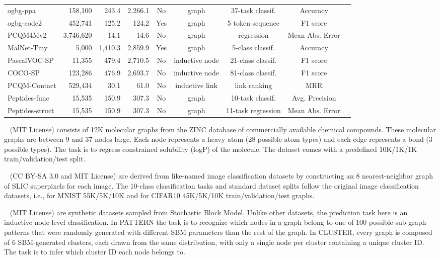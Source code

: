 \documentclass{article}
\begin{document}
\begin{table}[h]
\begin{adjustwidth}{-2.5 cm}{-2.5 cm}
\begin{tabular}{lrrrccccc}
    ogbg-ppa &158,100 &243.4 &2,266.1 &No &graph &37-task classif. &Accuracy \\
    ogbg-code2 &452,741 &125.2 &124.2 &Yes &graph &5 token sequence &F1 score \\
    PCQM4Mv2 &3,746,620 &14.1 &14.6 &No &graph &regression &Mean Abs. Error \\\midrule
    MalNet-Tiny &5,000 &1,410.3 &2,859.9 &Yes &graph &5-class classif. &Accuracy \\\midrule
    PascalVOC-SP & 11,355 & 479.4 & 2,710.5 & No &inductive node &21-class classif. &F1 score \\
    COCO-SP & 123,286 & 476.9 & 2,693.7 & No &inductive node &81-class classif. &F1 score \\
    PCQM-Contact & 529,434 & 30.1 & 61.0 & No &inductive link &link ranking &MRR \\
    Peptides-func & 15,535 & 150.9 & 307.3 & No &graph &10-task classif. &Avg. Precision \\
    Peptides-struct & 15,535 & 150.9 & 307.3 & No &graph &11-task regression &Mean Abs. Error \\
    \bottomrule
    \end{tabular}
\end{adjustwidth}\end{table}

~\cite{dwivedi2020benchmarking} (MIT License) consists of 12K molecular graphs from the ZINC database of commercially available chemical compounds. These molecular graphs are between 9 and 37 nodes large. Each node represents a heavy atom (28 possible atom types) and each edge represents a bond (3 possible types). The task is to regress constrained solubility (logP) of the molecule. The dataset comes with a predefined 10K/1K/1K train/validation/test split.

~\cite{dwivedi2020benchmarking} (CC BY-SA 3.0 and MIT License) are derived from like-named image classification datasets by constructing an 8 nearest-neighbor graph of SLIC superpixels for each image. The 10-class classification tasks and standard dataset splits follow the original image classification datasets, i.e., for MNIST 55K/5K/10K and for CIFAR10 45K/5K/10K train/validation/test graphs.

~\cite{dwivedi2020benchmarking} (MIT License) are synthetic datasets sampled from Stochastic Block Model. Unlike other datasets, the prediction task here is an inductive node-level classification. In PATTERN the task is to recognize which nodes in a graph belong to one of 100 possible sub-graph patterns that were randomly generated with different SBM parameters than the rest of the graph. In CLUSTER, every graph is composed of 6 SBM-generated clusters, each drawn from the same distribution, with only a single node per cluster containing a unique cluster ID. The task is to infer which cluster ID each node belongs to.
\end{document}
